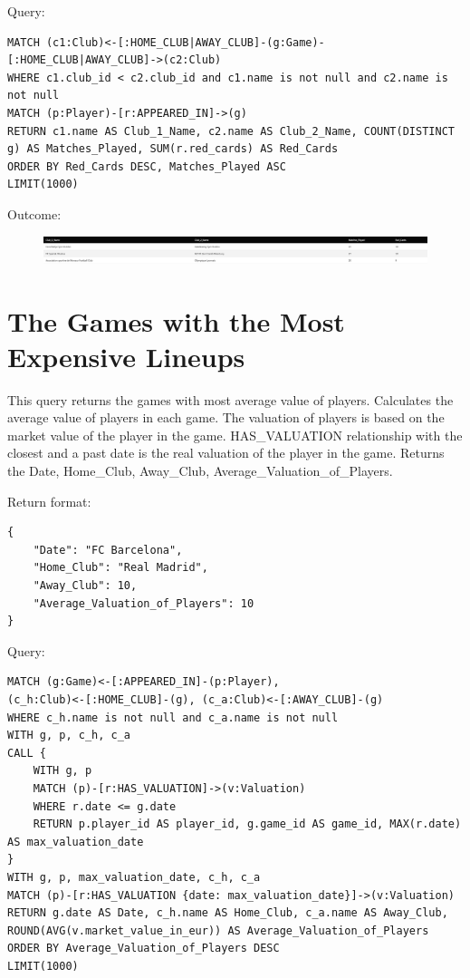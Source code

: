 \documentclass{Configuration_Files/PoliMi3i_thesis}
\begin{document}
Query:

\begin{lstlisting}[language=Cypher]
MATCH (c1:Club)<-[:HOME_CLUB|AWAY_CLUB]-(g:Game)-[:HOME_CLUB|AWAY_CLUB]->(c2:Club)
WHERE c1.club_id < c2.club_id and c1.name is not null and c2.name is not null
MATCH (p:Player)-[r:APPEARED_IN]->(g)
RETURN c1.name AS Club_1_Name, c2.name AS Club_2_Name, COUNT(DISTINCT g) AS Matches_Played, SUM(r.red_cards) AS Red_Cards
ORDER BY Red_Cards DESC, Matches_Played ASC
LIMIT(1000)
\end{lstlisting}


Outcome:
\begin{figure}[H]
    \centering
    \includegraphics[width=\linewidth]{Project Template/Images/query_output/q6.png}
\end{figure}






\section{The Games with the Most Expensive Lineups}
This query returns the games with most average value of players. Calculates the average value of players in each game. The valuation of players is based on the market value of the player in the game. HAS\_VALUATION relationship with the closest and a past date is the real valuation of the player in the game.
Returns the Date, Home\_Club, Away\_Club, Average\_Valuation\_of\_Players.

Return format:
\begin{lstlisting}[style=json]
 {
    "Date": "FC Barcelona",
    "Home_Club": "Real Madrid",
    "Away_Club": 10,
    "Average_Valuation_of_Players": 10
}
\end{lstlisting}


Query:

\begin{lstlisting}[language=Cypher]
MATCH (g:Game)<-[:APPEARED_IN]-(p:Player),
(c_h:Club)<-[:HOME_CLUB]-(g), (c_a:Club)<-[:AWAY_CLUB]-(g)
WHERE c_h.name is not null and c_a.name is not null
WITH g, p, c_h, c_a
CALL {
    WITH g, p
    MATCH (p)-[r:HAS_VALUATION]->(v:Valuation)
    WHERE r.date <= g.date
    RETURN p.player_id AS player_id, g.game_id AS game_id, MAX(r.date) AS max_valuation_date
}
WITH g, p, max_valuation_date, c_h, c_a
MATCH (p)-[r:HAS_VALUATION {date: max_valuation_date}]->(v:Valuation)
RETURN g.date AS Date, c_h.name AS Home_Club, c_a.name AS Away_Club, ROUND(AVG(v.market_value_in_eur)) AS Average_Valuation_of_Players
ORDER BY Average_Valuation_of_Players DESC
LIMIT(1000)
\end{lstlisting}
\end{document}
